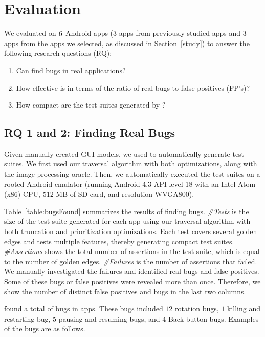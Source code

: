 \section{Evaluation}
\label{evaluation}

We evaluated \tool{} on $\textsc{6}$ Android apps ($3$ apps from previously studied apps and $3$ apps from the apps
we selected, as discussed in Section~\ref{study}) to answer the
following research questions (RQ):
\begin{enumerate}
\item 
Can \tool{} find bugs in real applications?
\item 
How effective is \tool{} in terms of the ratio of real bugs to false positives (FP's)?
\item 
How compact are the test suites generated by \tool?
\end{enumerate}

\subsection{RQ 1 and 2: Finding Real Bugs}
Given manually created GUI models, we used \tool{} to automatically
generate test suites. We first used our traversal algorithm with both optimizations, along with
the image processing oracle. Then, we automatically executed the test
suites on a rooted Android emulator (running Android 4.3 API level 18
with an Intel Atom (x86) CPU, 512 MB of SD card, and resolution
WVGA800).



Table~\ref{table:bugsFound} summarizes the results of finding bugs.
\emph{\#Tests} is the size of the test suite generated for each app
using our traversal algorithm with both truncation and prioritization
optimizations. Each test covers several golden edges and tests multiple features, 
thereby generating compact test suites.
\emph{\#Assertions} shows the total number of assertions in the test
suite, which is equal to the number of golden edges. \emph{\#Failures} is the number of assertions that failed. We
manually investigated the failures and identified real bugs and false
positives. Some of these bugs or false positives were revealed more
than once. Therefore, we show the number of distinct false positives
and bugs in the last two columns.

\tool{} found a total of \NumBugs{} bugs in \NumApps{} apps. These bugs included $12$ rotation bugs, $1$ killing and restarting bug, $5$ pausing and resuming bugs, and $4$ Back button bugs. Examples of the bugs are as follows.

